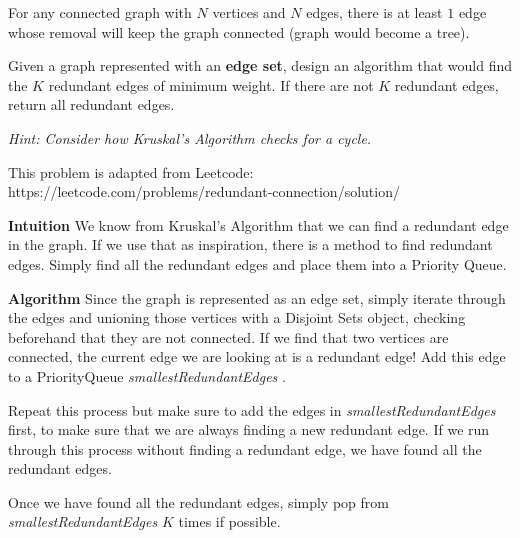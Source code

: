 \question
For any connected graph with $N$ vertices and $N$ edges, there is at least $1$ edge whose removal will keep the graph connected (graph would become a tree).

Given a graph represented with an \textbf{edge set}, design an algorithm that would find the $K$ redundant edges of minimum weight. If there are not $K$ redundant edges, return all redundant edges. 

\textit{Hint: Consider how Kruskal's Algorithm checks for a cycle.}

This problem is adapted from Leetcode: https://leetcode.com/problems/redundant-connection/solution/

\begin{solution}

\textbf{Intuition} \newline 
We know from Kruskal's Algorithm that we can find a redundant edge in the graph. If we use that as inspiration, there is a method to find redundant edges. Simply find all the redundant edges and place them into a Priority Queue. 

\textbf{Algorithm} \newline
Since the graph is represented as an edge set, simply iterate through the edges and unioning those vertices with a Disjoint Sets object, checking beforehand that they are not connected. If we find that two vertices are connected, the current edge we are looking at is a redundant edge! Add this edge to a PriorityQueue \textit{smallestRedundantEdges} . 

Repeat this process but make sure to add the edges in \textit{smallestRedundantEdges} first, to make sure that we are always finding a new redundant edge. If we run through this process without finding a redundant edge, we have found all the redundant edges.

Once we have found all the redundant edges, simply pop from \textit{smallestRedundantEdges} $K$ times if possible. 

\end{solution}






